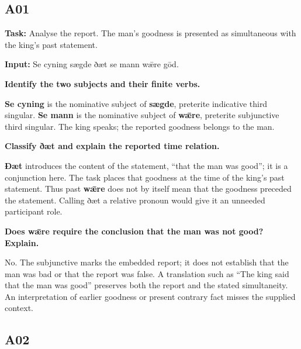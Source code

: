 \subsection*{A01}

\textbf{Task:} Analyse the report. The man’s goodness is presented as simultaneous with the king’s past statement.

\textbf{Input:} Se cyning sægde ðæt se mann wǣre gōd.

\textbf{Identify the two subjects and their finite verbs.}

\textbf{Se cyning} is the nominative subject of \textbf{sægde}, preterite indicative third singular. \textbf{Se mann} is the nominative subject of \textbf{wǣre}, preterite subjunctive third singular. The king speaks; the reported goodness belongs to the man.

\textbf{Classify ðæt and explain the reported time relation.}

\textbf{Ðæt} introduces the content of the statement, “that the man was good”; it is a conjunction here. The task places that goodness at the time of the king's past statement. Thus past \textbf{wǣre} does not by itself mean that the goodness preceded the statement. Calling ðæt a relative pronoun would give it an unneeded participant role.

\textbf{Does wǣre require the conclusion that the man was not good? Explain.}

No. The subjunctive marks the embedded report; it does not establish that the man was bad or that the report was false. A translation such as “The king said that the man was good” preserves both the report and the stated simultaneity. An interpretation of earlier goodness or present contrary fact misses the supplied context.

\subsection*{A02}

